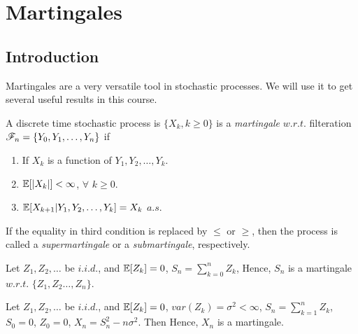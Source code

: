 \documentclass[all-lectures.tex]{subfiles}
\begin{document}

\chapter{Martingales}
\setcounter{section}{0}
\setcounter{subsection}{0}

\section*{}
\chr
\section{Introduction}
Martingales are a very versatile tool in stochastic processes. 
We will use it to get several useful results in this course.

A discrete time stochastic process is $\{X_k, k\ge 0\}$ is a \textit{martingale} $w.r.t.$ filteration $\mathscr{F}_n=\{Y_0, Y_1, \dots, Y_ n\}$ if 
\begin{enumerate}
\item If $X_k$ is a function of $Y_1, Y_2, \dots, Y_k$.
\item $\mathbb{E}[|X_k|] < \infty$, \quad $\forall$ $k \ge 0$.
\item $\mathbb{E}[X_{k+1}|Y_1, Y_2, \dots, Y_k] = X_k$ \quad $a.s.$
\end{enumerate}
 If the equality in third condition is replaced by $\le$ or $\ge$, then the process is called a \textit{supermartingale} or a \textit{submartingale}, respectively.
\begin{exmp}
Let $Z_1, Z_2, \dots $ be $i.i.d.$, and $\mathbb{E}[Z_k]=0$, $S_n = \sum_{k=0}^{n} Z_k$,
Hence, $S_n$ is a martingale $w.r.t.$ $\{Z_1,Z_2 \dots, Z_n\}$.
\end{exmp}

\begin{exmp}
Let $Z_1, Z_2, \dots $ be $i.i.d.$, and $\mathbb{E}[Z_k]=0$,  $var(Z_k)= \sigma^2 < \infty$,  $S_n = \sum_{k=1}^{n} Z_k$, $S_0 =0$, $Z_0=0$, $X_n = S^2_n - n \sigma^2$.
Then
Hence, $X_n$ is a martingale.
\end{exmp}
\end{document}
